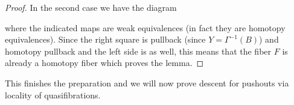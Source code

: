 \begin{lemma}
\begin{proof}
        In the second case we have the diagram
        \begin{center}
        \end{center}
        where the indicated maps are weak equivalences (in fact they are homotopy equivalences).
        Since the right square is pullback (since $Y=\Gamma^{-1}(B)$) and homotopy pullback and the left side is as well, this means that the fiber $F$ is already a homotopy fiber which proves the lemma.
    \end{proof}
\end{lemma}
This finishes the preparation and we will now prove descent for pushouts via locality of quasifibrations.
